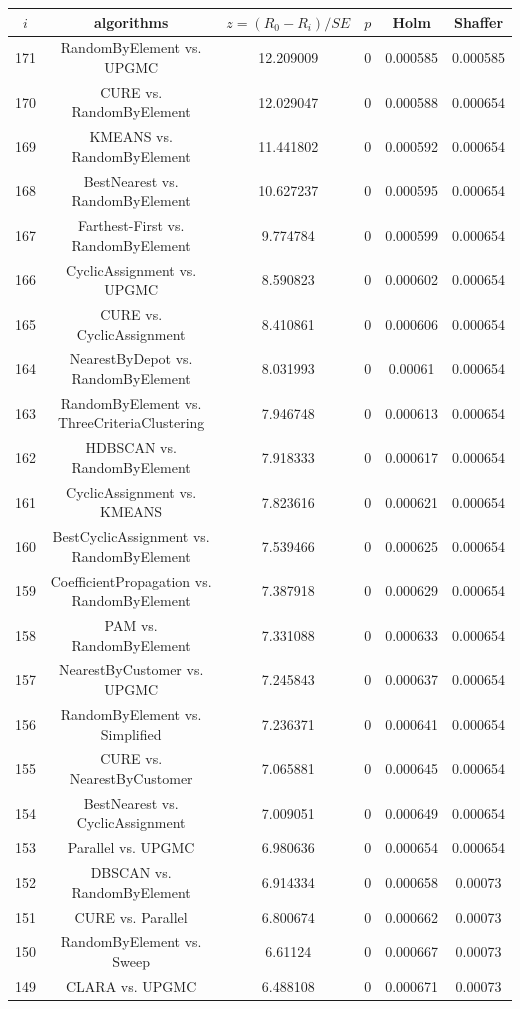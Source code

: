 \documentclass[a4paper,10pt]{article}
\begin{document}
\begin{landscape}
\begin{table}[!htp]
\centering\scriptsize
\begin{tabular}{cccccc}
$i$&algorithms&$z=(R_0 - R_i)/SE$&$p$&Holm&Shaffer\\
\hline171&RandomByElement vs. UPGMC&12.209009&0&0.000585&0.000585\\
170&CURE vs. RandomByElement&12.029047&0&0.000588&0.000654\\
169&KMEANS vs. RandomByElement&11.441802&0&0.000592&0.000654\\
168&BestNearest vs. RandomByElement&10.627237&0&0.000595&0.000654\\
167&Farthest-First vs. RandomByElement&9.774784&0&0.000599&0.000654\\
166&CyclicAssignment vs. UPGMC&8.590823&0&0.000602&0.000654\\
165&CURE vs. CyclicAssignment&8.410861&0&0.000606&0.000654\\
164&NearestByDepot vs. RandomByElement&8.031993&0&0.00061&0.000654\\
163&RandomByElement vs. ThreeCriteriaClustering&7.946748&0&0.000613&0.000654\\
162&HDBSCAN vs. RandomByElement&7.918333&0&0.000617&0.000654\\
161&CyclicAssignment vs. KMEANS&7.823616&0&0.000621&0.000654\\
160&BestCyclicAssignment vs. RandomByElement&7.539466&0&0.000625&0.000654\\
159&CoefficientPropagation vs. RandomByElement&7.387918&0&0.000629&0.000654\\
158&PAM vs. RandomByElement&7.331088&0&0.000633&0.000654\\
157&NearestByCustomer vs. UPGMC&7.245843&0&0.000637&0.000654\\
156&RandomByElement vs. Simplified&7.236371&0&0.000641&0.000654\\
155&CURE vs. NearestByCustomer&7.065881&0&0.000645&0.000654\\
154&BestNearest vs. CyclicAssignment&7.009051&0&0.000649&0.000654\\
153&Parallel vs. UPGMC&6.980636&0&0.000654&0.000654\\
152&DBSCAN vs. RandomByElement&6.914334&0&0.000658&0.00073\\
151&CURE vs. Parallel&6.800674&0&0.000662&0.00073\\
150&RandomByElement vs. Sweep&6.61124&0&0.000667&0.00073\\
149&CLARA vs. UPGMC&6.488108&0&0.000671&0.00073\\

\end{tabular}
\end{table}
\end{landscape}
\end{document}
